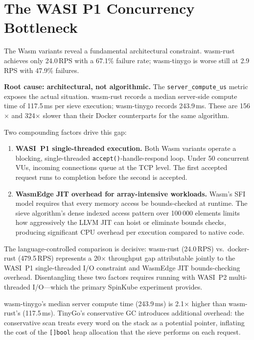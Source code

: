 \section{The WASI P1 Concurrency Bottleneck}
\label{app:wasmedge_bottleneck}

The Wasm variants reveal a fundamental architectural constraint. wasm-rust achieves only 24.0\,\acs{RPS} with a 67.1\% failure rate; wasm-tinygo is worse still at 2.9\,\acs{RPS} with 47.9\% failures.

\textbf{Root cause: architectural, not algorithmic.} The \texttt{server\_compute\_us} metric exposes the actual situation. wasm-rust records a median server-side compute time of 117.5\,ms per sieve execution; wasm-tinygo records 243.9\,ms. These are 156$\times$ and 324$\times$ slower than their Docker counterparts for the same algorithm.

Two compounding factors drive this gap:

\begin{enumerate}
    \item \textbf{\acs{WASI}~P1 single-threaded execution.} Both Wasm variants operate a blocking, single-threaded \texttt{accept()}-handle-respond loop. Under 50 concurrent \acp{VU}, incoming connections queue at the \acs{TCP} level. The first accepted request runs to completion before the second is accepted.

    \item \textbf{\acs{WasmEdge} \acs{JIT} overhead for array-intensive workloads.} \acs{Wasm}'s \acl{SFI} model requires that every memory access be bounds-checked at runtime. The sieve algorithm's dense indexed access pattern over 100\,000 elements limits how aggressively the \acs{LLVM} \acs{JIT} can hoist or eliminate bounds checks, producing significant \acs{CPU} overhead per execution compared to native code.
\end{enumerate}

The language-controlled comparison is decisive: wasm-rust (24.0\,\acs{RPS}) vs.\ docker-rust (479.5\,\acs{RPS}) represents a 20$\times$ throughput gap attributable jointly to the \acs{WASI}~P1 single-threaded I/O constraint and \acs{WasmEdge} \acs{JIT} bounds-checking overhead. Disentangling these two factors requires running with \acs{WASI}~P2 multi-threaded I/O---which the primary SpinKube experiment provides.

wasm-tinygo's median server compute time (243.9\,ms) is 2.1$\times$ higher than wasm-rust's (117.5\,ms). TinyGo's conservative \acs{GC} introduces additional overhead: the conservative scan treats every word on the stack as a potential pointer, inflating the cost of the \texttt{[]bool} heap allocation that the sieve performs on each request.

